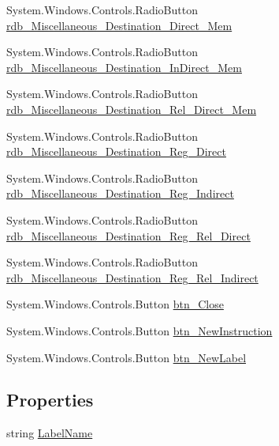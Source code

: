 \begin{DoxyCompactItemize}
System.\+Windows.\+Controls.\+Radio\+Button \hyperlink{class_c_p_u___o_s___simulator_1_1_instructions_window_aa5e745bee7aeb2052c1aea6f5b4c1650}{rdb\+\_\+\+Miscellaneous\+\_\+\+Destination\+\_\+\+Direct\+\_\+\+Mem}
\item 
System.\+Windows.\+Controls.\+Radio\+Button \hyperlink{class_c_p_u___o_s___simulator_1_1_instructions_window_a5e421def72655cb78d3402989b5be384}{rdb\+\_\+\+Miscellaneous\+\_\+\+Destination\+\_\+\+In\+Direct\+\_\+\+Mem}
\item 
System.\+Windows.\+Controls.\+Radio\+Button \hyperlink{class_c_p_u___o_s___simulator_1_1_instructions_window_a13e6577b2d4110de4603ade48fec5282}{rdb\+\_\+\+Miscellaneous\+\_\+\+Destination\+\_\+\+Rel\+\_\+\+Direct\+\_\+\+Mem}
\item 
System.\+Windows.\+Controls.\+Radio\+Button \hyperlink{class_c_p_u___o_s___simulator_1_1_instructions_window_a4e53d4c5587379da5e51880438647b1e}{rdb\+\_\+\+Miscellaneous\+\_\+\+Destination\+\_\+\+Reg\+\_\+\+Direct}
\item 
System.\+Windows.\+Controls.\+Radio\+Button \hyperlink{class_c_p_u___o_s___simulator_1_1_instructions_window_afbd11c7e892431885cf3f5107a711800}{rdb\+\_\+\+Miscellaneous\+\_\+\+Destination\+\_\+\+Reg\+\_\+\+Indirect}
\item 
System.\+Windows.\+Controls.\+Radio\+Button \hyperlink{class_c_p_u___o_s___simulator_1_1_instructions_window_affe885e2e13d3c0c495609e9321442b5}{rdb\+\_\+\+Miscellaneous\+\_\+\+Destination\+\_\+\+Reg\+\_\+\+Rel\+\_\+\+Direct}
\item 
System.\+Windows.\+Controls.\+Radio\+Button \hyperlink{class_c_p_u___o_s___simulator_1_1_instructions_window_a4849f98f98d943f0f4636a64439a4580}{rdb\+\_\+\+Miscellaneous\+\_\+\+Destination\+\_\+\+Reg\+\_\+\+Rel\+\_\+\+Indirect}
\item 
System.\+Windows.\+Controls.\+Button \hyperlink{class_c_p_u___o_s___simulator_1_1_instructions_window_a06305ca0735ae2d93a331fb33d2fe88f}{btn\+\_\+\+Close}
\item 
System.\+Windows.\+Controls.\+Button \hyperlink{class_c_p_u___o_s___simulator_1_1_instructions_window_af14b4b4dda771ab0b04da0769b45cfc0}{btn\+\_\+\+New\+Instruction}
\item 
System.\+Windows.\+Controls.\+Button \hyperlink{class_c_p_u___o_s___simulator_1_1_instructions_window_a58adb73d7a596c7e1e922a4657e32009}{btn\+\_\+\+New\+Label}
\end{DoxyCompactItemize}
\subsection*{Properties}
\begin{DoxyCompactItemize}
\item 
string \hyperlink{class_c_p_u___o_s___simulator_1_1_instructions_window_a46ace6a9298e94c75f204404a846801a}{Label\+Name}
\end{DoxyCompactItemize}
